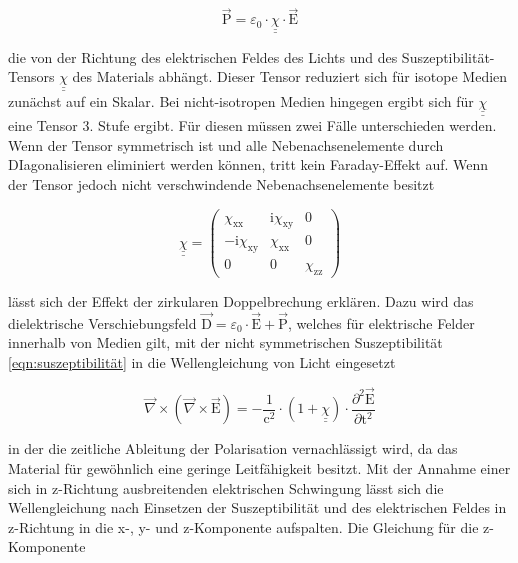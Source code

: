         \begin{equation}
            \vec{\text{P}} = \varepsilon_0 \cdot \underline{\underline{\chi}} \cdot \vec{\text{E}} 
            \label{eqn:polarisation}
        \end{equation}

        die von der Richtung des elektrischen Feldes des Lichts und des Suszeptibilität-Tensors $\underline{\underline{\chi}}$ des Materials abhängt. Dieser Tensor reduziert sich für isotope Medien zunächst
        auf ein Skalar. Bei nicht-isotropen Medien hingegen ergibt sich für $\underline{\underline{\chi}}$ eine Tensor 3. Stufe ergibt. Für diesen müssen zwei Fälle unterschieden werden. Wenn der Tensor 
        symmetrisch ist und alle Nebenachsenelemente durch DIagonalisieren eliminiert werden können, tritt kein Faraday-Effekt auf. Wenn der Tensor jedoch nicht verschwindende Nebenachsenelemente besitzt
        
        \begin{equation*}
            \underline{\underline{\chi}} =
            \begin{pmatrix}
                \chi_{\text{xx}} & \text{i} \chi_{\text{xy}} & 0 \\
                -\text{i}\chi_{\text{xy}} & \chi_{\text{xx}} & 0 \\
                0 & 0 & \chi_{\text{zz}}
            \end{pmatrix}
            \label{eqn:suszeptibilität}
        \end{equation*}

        lässt sich der Effekt der zirkularen Doppelbrechung erklären. Dazu wird das dielektrische Verschiebungsfeld $\vec{\text{D}} = \varepsilon_0 \cdot \vec{\text{E}} + \vec{\text{P}}$, welches für elektrische Felder
        innerhalb von Medien gilt, mit der nicht symmetrischen Suszeptibilität \ref{eqn:suszeptibilität} in die Wellengleichung von Licht eingesetzt

        \begin{equation*}
            \vec{\nabla} \times \left(\vec{\nabla} \times \vec{\text{E}}\right) = - \frac{1}{\text{c}^2} \cdot \left(1 + \underline{\underline{\chi}}\right) \cdot \frac{\partial^2\vec{\text{E}}}{\partial\text{t}^2}
        \end{equation*}

        in der die zeitliche Ableitung der Polarisation vernachlässigt wird, da das Material für gewöhnlich eine geringe Leitfähigkeit besitzt. Mit der Annahme einer sich in z-Richtung ausbreitenden 
        elektrischen Schwingung lässt sich die Wellengleichung nach Einsetzen der Suszeptibilität und des elektrischen Feldes in z-Richtung in die x-, y- und z-Komponente aufspalten. Die Gleichung für die 
        z-Komponente

